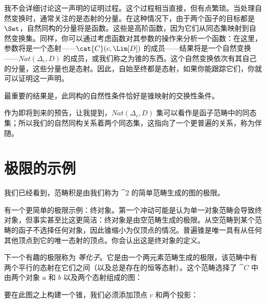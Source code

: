 我不会详细讨论这一声明的证明过程。这个过程相当直接，但有点繁琐。当处理自然变换时，通常关注的是态射的分量。在这种情况下，由于两个函子的目标都是 $\Set$，自然同构的分量将是函数。这些是高阶函数，因为它们从同态集映射到自然变换集。同样，你可以通过考虑函数对其参数的操作来分析一个函数：在这里，参数将是一个态射——$\cat{C}(c, \Lim[D])$ 的成员——结果将是一个自然变换——$\mathit{Nat}(\Delta_c, D)$ 的成员，或我们称之为锥的东西。这个自然变换依次有其自己的分量，这些分量也是态射。因此，自始至终都是态射，如果你能跟踪它们，你就可以证明这一声明。

最重要的结果是，此同构的自然性条件恰好是锥映射的交换性条件。

作为即将到来的预告，让我提到，$\mathit{Nat}(\Delta_c, D)$ 集可以看作是函子范畴中的同态集；所以我们的自然同构关系着两个同态集，这指向了一个更普遍的关系，称为伴随。

\section{极限的示例}

我们已经看到，范畴积是由我们称为 $\cat{2}$ 的简单范畴生成的图的极限。

有一个更简单的极限示例：终对象。第一个冲动可能是认为单一对象范畴会导致终对象，但事实甚至比这更简洁：终对象是由空范畴生成的极限。从空范畴到某个范畴的函子不选择任何对象，因此锥缩小为仅顶点的情况。普遍锥是唯一具有从任何其他顶点到它的唯一态射的顶点。你会认出这是终对象的定义。

下一个有趣的极限称为 \emph{等化子}。它是由一个两元素范畴生成的极限，该范畴中有两个平行的态射在它们之间（以及总是存在的恒等态射）。这个范畴选择了 $\cat{C}$ 中由两个对象 $a$ 和 $b$ 以及两个态射组成的图：


要在此图之上构建一个锥，我们必须添加顶点 $c$ 和两个投影：


